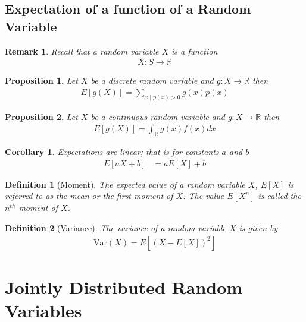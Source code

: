 \documentclass[11pt, oneside]{book}   	%
\newtheorem{definition}{Definition}[chapter]
\newtheorem{remark}{Remark}[chapter]
\newtheorem{corollary}{Corollary}[chapter]
\newtheorem{proposition}{Proposition}[chapter]
\newcommand{\var}[1]{\mathrm{Var}\left(#1\right)}
\begin{document}
\begin{spacing}{1.618}
\subsection{Expectation of a function of a Random Variable}

\begin{remark}
	Recall that a random variable $X$ is a function 
	\begin{alignat}{4}
		X:S\to \mathbb{R}
	\end{alignat}
\end{remark}

\begin{proposition}
	Let $X$ be a discrete random variable and $g:X\to \mathbb{R}$ then 
	\begin{alignat}{4}
		E[g(X)]=\sum_{x\mid p(x)>0}g(x)p(x)
	\end{alignat}
\end{proposition}

\begin{proposition}
	Let $X$ be a continuous random variable and $g:X\to\mathbb{R}$ then 
	\begin{alignat}{4}
		E[g(X)]=\int_{\mathbb{R}}g(x)f(x)dx
	\end{alignat}
\end{proposition}

\begin{corollary}
	Expectations are linear; that is for constants $a$ and $b$
	\begin{alignat}{4}
		E[aX+b]&=aE[X]+b
	\end{alignat}
\end{corollary}

\begin{definition}[Moment]
	The expected value of a random variable $X$, $E[X]$ is referred to as the \emph{mean} or the first \emph{moment} of $X$. The value $E\left[X^n\right]$ is called the $n^{th}$ moment of $X$. 
\end{definition}

\begin{definition}[Variance]
	The \emph{variance} of a random variable $X$ is given by 
	\begin{alignat}{4}
		\var{X}=E\left[\left(X-E[X]\right)^2\right]
	\end{alignat}
\end{definition}

\section{Jointly Distributed Random Variables}


\end{spacing}
\end{document}
